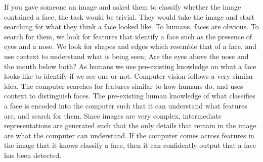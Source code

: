 \documentclass{l4proj}
\begin{document}
If you gave someone an image and asked them to classify whether the image contained a face, the task would be trivial. They would take the image and start searching for what they think a face looked like. To humans, faces are obvious. To search for them, we look for features that identify a face such as the presence of eyes and a nose. We look for shapes and edges which resemble that of a face, and use context to understand what is being seen; Are the eyes above the nose and the mouth below both? As humans we use pre-existing knowledge on what a face looks like to identify if we see one or not. Computer vision follows a very similar idea. The computer searches for features similar to how humans do, and uses context to distinguish faces. The pre-existing human knowledge of what classifies a face is encoded into the computer such that it can understand what features are, and search for them. Since images are very complex, intermediate representations are generated such that the only details that remain in the image are what the computer can understand. If the computer comes across features in the image that it knows classify a face, then it can confidently output that a face has been detected.
\end{document}
